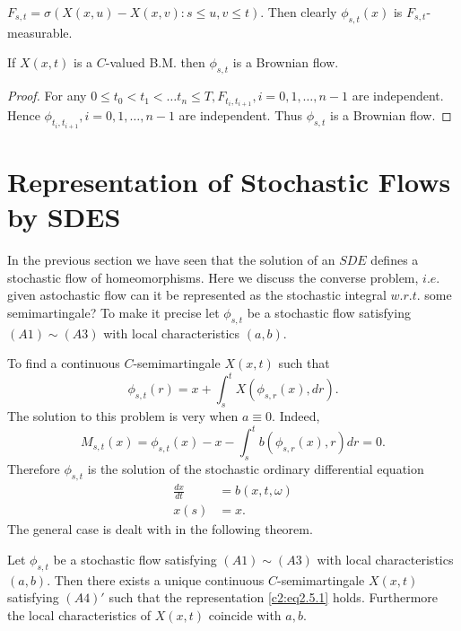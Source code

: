 \setcounter{definition}{3}
\begin{definition}\label{c2:def2.4.4}%
  $F_{s,t}= \sigma(X(x,u)-X(x,v):s \leq u, v \leq t)$. Then clearly
  $\phi_{s,t}(x)$ is $F_{s,t}$-measurable. 
\end{definition}

\setcounter{coro}{4}
\begin{coro}\label{c2:cor2.4.5}%
  If $X(x,t)$ is a $C$-valued B.M. then $\phi_{s,t}$ is a Brownian flow.
\end{coro}

\begin{proof}
  For any $0 \leq t_0 < t_1 < \ldots t_n \leq T,F_{t_i,t_{i+1}},i=0,1,
  \ldots,n-1 $ are independent. 
  Hence $\phi_{t_i,t_{i+1}},i=0,1, \ldots,n-1$ are independent. Thus
  $\phi_{s,t}$ is a Brownian flow. 
\end{proof}

\section{Representation of Stochastic Flows by SDES}\label{chap2:sec2.5}%

In the previous section we have seen that the solution of an $SDE$
defines a stochastic flow of homeomorphisms. Here we discuss the
converse problem, $i.e$. given a\pageoriginale stochastic flow can it be
represented as the stochastic integral $w.r.t$. some semimartingale?
To make it precise let $\phi_{s,t}$ be a stochastic flow satisfying
$(A1) \sim (A3)$ with local characteristics $(a,b)$. 


\medskip
{}
  To find a continuous $C$-semimartingale $X(x,t)$ such that 
  \begin{equation*}
    \phi_{s,t}(r)=x+ \int^t_s 
X(\phi_{s,r}(x),dr). \tag{2.5.1}\label{c2:eq2.5.1}
  \end{equation*}
  The solution to this problem is very when $a \equiv 0$. Indeed,
  $$
  M_{s,t}(x)=\phi_{s,t}(x)-x-\int^t_s b(\phi_{s,r}(x),r)dr=0.
  $$
  Therefore $\phi_{s,t}$ is the solution of the stochastic ordinary
  differential equation 
  \begin{align*}
    \frac{dx}{dt} & =b(x,t,\omega)\\
    x(s) & = x.
  \end{align*}
  The general case is dealt with in the following theorem.


\begin{theorem}\label{c2:thm2.5.1}%
Let $\phi_{s,t}$ be a stochastic flow satisfying $(A1)\sim (A3)$ with
local characteristics $(a,b)$. Then there exists a unique continuous
$C$-semimartingale $X(x,t)$ satisfying $(A4)'$ such that the
representation \eqref{c2:eq2.5.1} holds. Furthermore the local 
characteristics of $X(x,t)$ coincide with $a,b$.  
\end{theorem}

